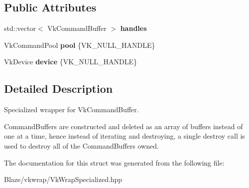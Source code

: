 \subsection*{Public Attributes}
\begin{DoxyCompactItemize}
\item 
\mbox{\label{structblaze_1_1vkw_1_1CommandBufferVector_a0b2467f730beee33b1783b2ea272be20}} 
std\+::vector$<$ Vk\+Command\+Buffer $>$ {\bfseries handles}
\item 
\mbox{\label{structblaze_1_1vkw_1_1CommandBufferVector_abff6078cdaf87f82d1896571f3a9f1e0}} 
Vk\+Command\+Pool {\bfseries pool} \{V\+K\+\_\+\+N\+U\+L\+L\+\_\+\+H\+A\+N\+D\+LE\}
\item 
\mbox{\label{structblaze_1_1vkw_1_1CommandBufferVector_a3069c13a95fece8038f1095692797f11}} 
Vk\+Device {\bfseries device} \{V\+K\+\_\+\+N\+U\+L\+L\+\_\+\+H\+A\+N\+D\+LE\}
\end{DoxyCompactItemize}


\subsection{Detailed Description}
Specialized wrapper for Vk\+Command\+Buffer. 

Command\+Buffers are constructed and deleted as an array of buffers instead of one at a time, hence instead of iterating and destroying, a single destroy call is used to destroy all of the Command\+Buffers owned. 

The documentation for this struct was generated from the following file\+:\begin{DoxyCompactItemize}
\item 
Blaze/vkwrap/Vk\+Wrap\+Specialized.\+hpp\end{DoxyCompactItemize}
